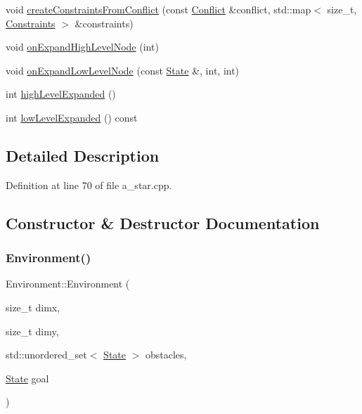 \begin{DoxyCompactItemize}
\item 
void \hyperlink{class_environment_a532b4870bfa50eb350e037dc8aa06291}{create\+Constraints\+From\+Conflict} (const \hyperlink{struct_conflict}{Conflict} \&conflict, std\+::map$<$ size\+\_\+t, \hyperlink{struct_constraints}{Constraints} $>$ \&constraints)
\item 
void \hyperlink{class_environment_ad8d27db649c723053fe9d90d97c0e4cd}{on\+Expand\+High\+Level\+Node} (int)
\item 
void \hyperlink{class_environment_ad00ee2a501b1e78f19c86a0d01e49d52}{on\+Expand\+Low\+Level\+Node} (const \hyperlink{struct_state}{State} \&, int, int)
\item 
int \hyperlink{class_environment_a117b88b2a1e0267cfe28d0a6545af72d}{high\+Level\+Expanded} ()
\item 
int \hyperlink{class_environment_af870f6d7c69f7401f5d724b0ee60308f}{low\+Level\+Expanded} () const
\end{DoxyCompactItemize}


\subsection{Detailed Description}


Definition at line 70 of file a\+\_\+star.\+cpp.



\subsection{Constructor \& Destructor Documentation}
\mbox{\label{class_environment_a0ddc9c7b0862c1313b1ca99c2acb6d93}} 
\subsubsection{\texorpdfstring{Environment()}{Environment()}\hspace{0.1cm}{\footnotesize\ttfamily [1/6]}}
{\footnotesize\ttfamily Environment\+::\+Environment (\begin{DoxyParamCaption}\item[{size\+\_\+t}]{dimx,  }\item[{size\+\_\+t}]{dimy,  }\item[{std\+::unordered\+\_\+set$<$ \hyperlink{struct_state}{State} $>$}]{obstacles,  }\item[{\hyperlink{struct_state}{State}}]{goal }\end{DoxyParamCaption})\hspace{0.3cm}{\ttfamily [inline]}}



